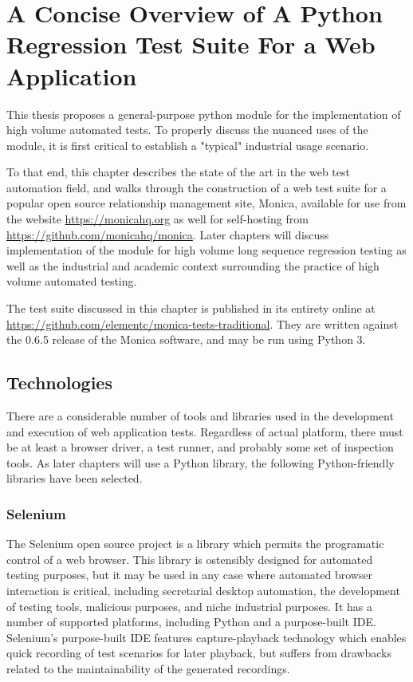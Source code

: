 \chapter{A Concise Overview of A Python Regression Test Suite For a Web Application}
This thesis proposes a general-purpose python module for the implementation of high volume automated tests. To properly discuss the nuanced uses of the module, it is first critical to establish a "typical" industrial usage scenario.

To that end, this chapter describes the state of the art in the web test automation field, and walks through the construction of a web test suite for a popular open source relationship management site, Monica, available for use from the website \url{https://monicahq.org} as well for self-hosting from \url{https://github.com/monicahq/monica}. Later chapters will discuss implementation of the module for high volume long sequence regression testing as well as the industrial and academic context surrounding the practice of high volume automated testing.

The test suite discussed in this chapter is published in its entirety online at \url{https://github.com/elementc/monica-tests-traditional}. They are written against the 0.6.5 release of the Monica software, and may be run using Python 3.

\section{Technologies}
There are a considerable number of tools and libraries used in the development and execution of web application tests.\citep{kaur2013comparative} Regardless of actual platform, there must be at least a browser driver, a test runner, and probably some set of inspection tools. As later chapters will use a Python library, the following Python-friendly libraries have been selected.

\subsection{Selenium}
The Selenium open source project is a library which permits the programatic control of a web browser.\citep{holmes2006automating} This library is ostensibly designed for automated testing purposes\citep{razak2011agile}, but it may be used in any case where automated browser interaction is critical, including secretarial desktop automation, the development of testing tools, malicious purposes, and niche industrial purposes.\citep{kongsli2007security} It has a number of supported platforms, including Python and a purpose-built IDE.\citep{bruns2009web} Selenium's purpose-built IDE features capture-playback technology which enables quick recording of test scenarios for later playback, but suffers from drawbacks related to the maintainability of the generated recordings.\citep{leotta2013capture}

